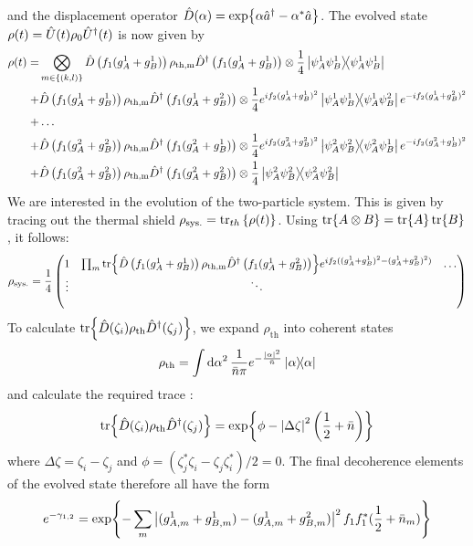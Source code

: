 and the displacement operator $\hat{D}(\alpha)=\exp{\alpha \hat{a}^\dagger - \alpha^*\hat{a}}$. The evolved state $\rho(t)=\hat{U}(t)\rho_0\hat{U}^\dagger(t)$ is now given by
\begin{align}
\begin{split}
  \rho(t) =& \bigotimes_{m\in\{(k,l)\}} \hat{D}\left(f_1(g^1_A + g^1_B)\right)\rho_\mathrm{th,m}\hat{D}^\dagger\left(f_1(g^1_A + g^1_B)\right) \otimes \frac{1}{4} \ketbra{\psi^1_A\psi^1_B} \\
  +& \hat{D}\left(f_1(g^1_A + g^1_B)\right)\rho_\mathrm{th,m}\hat{D}^\dagger\left(f_1(g^1_A + g^2_B)\right) \otimes \frac{1}{4} e^{if_2(g^1_A + g^1_B)^2} \ketbra{\psi^1_A\psi^1_B}{\psi^1_A\psi^2_B} e^{-if_2(g^1_A + g^2_B)^2} \\
  +& \dots \\
  +& \hat{D}\left(f_1(g^2_A + g^2_B)\right)\rho_\mathrm{th,m}\hat{D}^\dagger\left(f_1(g^2_A + g^1_B)\right) \otimes \frac{1}{4} e^{if_2(g^2_A + g^2_B)^2} \ketbra{\psi^2_A\psi^2_B}{\psi^2_A\psi^1_B} e^{-if_2(g^2_A + g^1_B)^2} \\
  +& \hat{D}\left(f_1(g^2_A + g^2_B)\right)\rho_\mathrm{th,m}\hat{D}^\dagger\left(f_1(g^2_A + g^2_B)\right) \otimes \frac{1}{4}\ketbra{\psi^2_A\psi^2_B}
\end{split}
\end{align}
We are interested in the evolution of the two-particle system. This is given by tracing out the thermal shield $\rho_\mathrm{sys.} = \tr_{th}\left\{\rho(t)\right\}$. Using $\tr{A \otimes B} = \tr{A}\tr{B}$, it follows:
\begin{equation}
  \rho_\mathrm{sys.} = \frac{1}{4}\begin{pmatrix}
    1 & \prod_{m}\tr{\hat{D}\left(f_1(g^1_A + g^1_B)\right)\rho_\mathrm{th,m}\hat{D}^\dagger\left(f_1(g^1_A + g^2_B)\right)} e^{i f_2((g^1_A + g^1_B)^2 - (g^1_A + g^2_B)^2)} & \dots \\
    \vdots & \ddots & \\
    & & 
  \end{pmatrix}
\end{equation}
To calculate $\tr{\hat{D}(\zeta_i)\rho_\mathrm{th}\hat{D}^\dagger(\zeta_j)}$, we expand $\rho_\mathrm{th}$ into coherent states \cite{Steiner_2024}
\begin{equation}
  \rho_\mathrm{th} = \int \dd \alpha^2 \, \frac{1}{\bar{n}\pi} e^{-\frac{\left\lvert\alpha\right\rvert^2}{\bar{n}}} \ketbra{\alpha}
\end{equation}
and calculate the required trace \cite{Steiner_2024}:
\begin{equation}
  \tr{\hat{D}(\zeta_i)\rho_\mathrm{th}\hat{D}^\dagger(\zeta_j)} = \exp{\phi - \left\lvert\Delta \zeta\right\rvert^2 \left(\frac{1}{2} + \bar{n}\right)}
\end{equation}
where $\Delta \zeta = \zeta_i - \zeta_j$ and $\phi = (\zeta_j^*\zeta_i - \zeta_j\zeta_i^*)/2 = 0$.
The final decoherence elements of the evolved state therefore all have the form
\begin{equation}
  e^{-\gamma_{1,2}} = \exp{- \sum_{m} \left\lvert(g^1_{A,m} + g^1_{B,m})-(g^1_{A,m} + g^2_{B,m})\right\rvert^2 f_1f^*_1 (\frac{1}{2} + \bar{n}_m)}
\end{equation}
